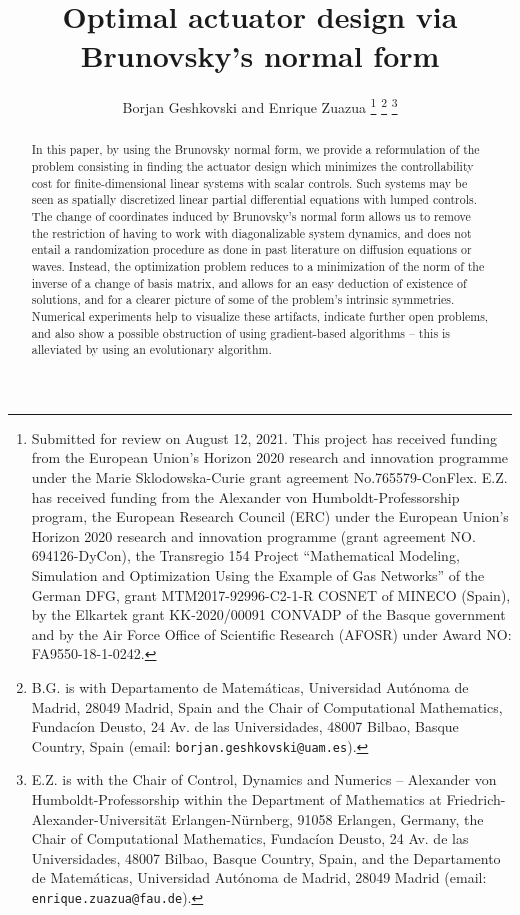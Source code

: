 \documentclass[journal,twoside,web]{ieeecolor}
\begin{document}
\title{Optimal actuator design via Brunovsky's normal form}
\author{Borjan Geshkovski and Enrique Zuazua
\thanks{Submitted for review on August 12, 2021.
This project has received funding from the European Union's Horizon 2020 research and innovation programme under the Marie Sklodowska-Curie grant agreement No.765579-ConFlex. E.Z. has received funding from the Alexander von Humboldt-Professorship program, the European Research Council (ERC) under the European Union’s Horizon 2020 research and innovation programme (grant agreement NO. 694126-DyCon), the Transregio 154 Project “Mathematical Modeling, Simulation and Optimization Using the Example of Gas Networks” of the German DFG, grant MTM2017-92996-C2-1-R COSNET of MINECO (Spain), by the Elkartek grant KK-2020/00091 CONVADP of the Basque government and by the Air Force Office of Scientific Research (AFOSR) under Award NO: FA9550-18-1-0242.}
\thanks{B.G. is with Departamento de Matemáticas, Universidad Autónoma de Madrid, 28049 Madrid, Spain and the Chair of Computational Mathematics, Fundacíon Deusto, 24 Av. de las Universidades, 48007 Bilbao, Basque Country, Spain (email: \texttt{borjan.geshkovski@uam.es}).}
\thanks{E.Z. is with the Chair of Control, Dynamics and Numerics -- Alexander von Humboldt-Professorship within the Department of Mathematics at Friedrich-Alexander-Universität Erlangen-Nürnberg, 91058 Erlangen, Germany, 
the Chair of Computational Mathematics, Fundacíon Deusto, 24 Av. de las Universidades, 48007 Bilbao, Basque Country, Spain, and the Departamento de Matemáticas, Universidad Autónoma de Madrid, 28049 Madrid (email: \texttt{enrique.zuazua@fau.de}).}
}

\maketitle

\begin{abstract}
	In this paper, by using the Brunovsky normal form, we provide a reformulation of the problem consisting in finding the actuator design which minimizes the controllability cost for finite-dimensional linear systems with scalar controls.
Such systems may be seen as spatially discretized linear partial differential equations with lumped controls. 
		The change of coordinates induced by Brunovsky's normal form allows us to remove the restriction of having to work with diagonalizable system dynamics, and does not entail a randomization procedure as done in past literature on diffusion equations or waves. 
		Instead, the optimization problem reduces to a minimization of the norm of the inverse of a change of basis matrix, and allows for an easy deduction of  existence of solutions, and for a clearer picture of some of the problem's intrinsic symmetries. 
		Numerical experiments help to visualize these artifacts, indicate further open problems, and also show a possible obstruction of using gradient-based algorithms -- this is alleviated by using an evolutionary algorithm.
\end{abstract}
\end{document}
